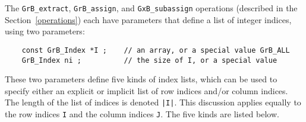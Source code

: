 \documentclass[12pt]{article}
\begin{document}
The \verb'GrB_extract', \verb'GrB_assign', and \verb'GxB_subassign' operations
(described in the Section~\ref{operations}) each have parameters that define a
list of integer indices, using two parameters:

    \vspace{-0.05in}
    {\footnotesize
    \begin{verbatim}
    const GrB_Index *I ;    // an array, or a special value GrB_ALL
    GrB_Index ni ;          // the size of I, or a special value \end{verbatim}}

\vspace{-0.05in}
These two parameters define five kinds of index lists, which can be used to
specify either an explicit or implicit list of row indices and/or column
indices.  The length of the list of indices is denoted \verb'|I|'.  This
discussion applies equally to the row indices \verb'I' and the column indices
\verb'J'.  The five kinds are listed below.
\end{document}
